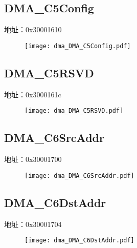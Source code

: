 \subsection{DMA\_C5Config}
\label{dma-DMA-C5Config}
地址：0x30001610
 \begin{figure}[H]
\texttt{[image: dma\_DMA\_C5Config.pdf]}
\end{figure}

\subsection{DMA\_C5RSVD}
\label{dma-DMA-C5RSVD}
地址：0x3000161c
 \begin{figure}[H]
\texttt{[image: dma\_DMA\_C5RSVD.pdf]}
\end{figure}

\subsection{DMA\_C6SrcAddr}
\label{dma-DMA-C6SrcAddr}
地址：0x30001700
 \begin{figure}[H]
\texttt{[image: dma\_DMA\_C6SrcAddr.pdf]}
\end{figure}

\subsection{DMA\_C6DstAddr}
\label{dma-DMA-C6DstAddr}
地址：0x30001704
 \begin{figure}[H]
\texttt{[image: dma\_DMA\_C6DstAddr.pdf]}
\end{figure}

